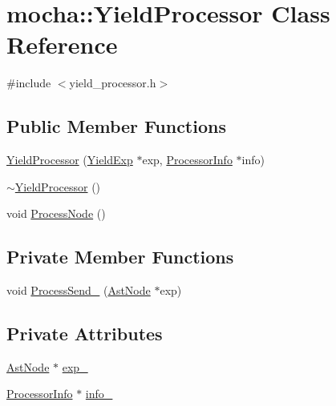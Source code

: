 \hypertarget{classmocha_1_1_yield_processor}{
\section{mocha::YieldProcessor Class Reference}
\label{classmocha_1_1_yield_processor}
}


{\ttfamily \#include $<$yield\_\-processor.h$>$}

\subsection*{Public Member Functions}
\begin{DoxyCompactItemize}
\item 
\hyperlink{classmocha_1_1_yield_processor_aef269683bb918b4128660fd098df8b0f}{YieldProcessor} (\hyperlink{classmocha_1_1_yield_exp}{YieldExp} $\ast$exp, \hyperlink{classmocha_1_1_processor_info}{ProcessorInfo} $\ast$info)
\item 
\hyperlink{classmocha_1_1_yield_processor_a76160e67f396433649a5d3bd5cfed622}{$\sim$YieldProcessor} ()
\item 
void \hyperlink{classmocha_1_1_yield_processor_a63e67f4d43b1c78ade2693e1632e3baa}{ProcessNode} ()
\end{DoxyCompactItemize}
\subsection*{Private Member Functions}
\begin{DoxyCompactItemize}
\item 
void \hyperlink{classmocha_1_1_yield_processor_afc1026c8704cf0911bd5fed57b12d9ee}{ProcessSend\_\-} (\hyperlink{classmocha_1_1_ast_node}{AstNode} $\ast$exp)
\end{DoxyCompactItemize}
\subsection*{Private Attributes}
\begin{DoxyCompactItemize}
\item 
\hyperlink{classmocha_1_1_ast_node}{AstNode} $\ast$ \hyperlink{classmocha_1_1_yield_processor_a6ae01b7dcf8141b8eca1a80b026ae23a}{exp\_\-}
\item 
\hyperlink{classmocha_1_1_processor_info}{ProcessorInfo} $\ast$ \hyperlink{classmocha_1_1_yield_processor_a9e60f7548c1c1af21d232bdba5bf2d90}{info\_\-}
\end{DoxyCompactItemize}


